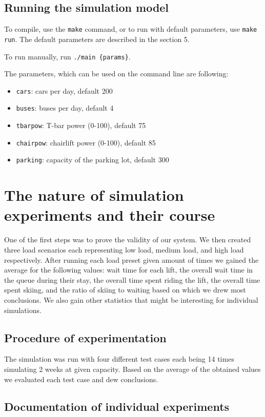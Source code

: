 \documentclass[11pt,a4paper]{article}
\begin{document}
\subsection{Running the simulation model}
To compile, use the \verb|make| command, or to run with default parameters, use \verb|make run|. The default parameters are described in the section 5.

To run manually, run \verb|./main {params}|.

The parameters, which can be used on the command line are following:
\begin{itemize}
    \item \verb|cars|: cars per day, default 200
    \item \verb|buses|: buses per day, default 4
    \item \verb|tbarpow|: T-bar power (0-100), default 75
    \item \verb|chairpow|: chairlift power (0-100), default 85
    \item \verb|parking|: capacity of the parking lot, default 300
\end{itemize}

\section{The nature of simulation experiments and their course}
One of the first steps was to prove the validity of our system. We then created three load scenarios each representing low load, medium load, and high load respectively. After running each load preset given amount of times we gained the average for the following values: wait time for each lift, the overall wait time in the queue during their stay, the overall time spent riding the lift, the overall time spent skiing, and the ratio of skiing to waiting based on which we drew most conclusions. We also gain other statistics that might be interesting for individual simulations. 

\subsection{Procedure of experimentation}
The simulation was run with four different test cases each being 14 times simulating 2 weeks at given capacity. Based on the average of the obtained values we evaluated each test case and dew conclusions.

\subsection{Documentation of individual experiments}
\end{document}
